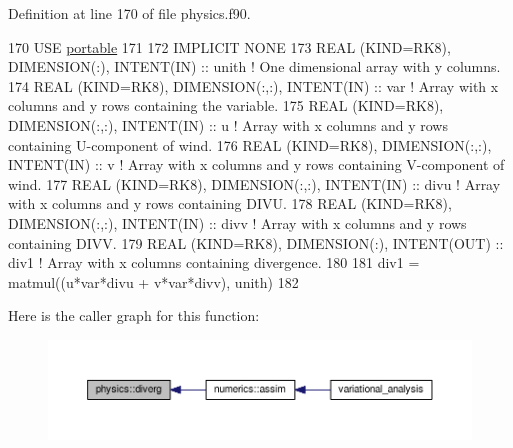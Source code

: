 Definition at line 170 of file physics.\+f90.


\begin{DoxyCode}
170 \textcolor{keywordtype}{USE }\hyperlink{namespaceportable}{portable}
171 
172 \textcolor{keywordtype}{IMPLICIT NONE}
173 \textcolor{keywordtype}{REAL (KIND=RK8)}, \textcolor{keywordtype}{DIMENSION(:)}, \textcolor{keywordtype}{INTENT(IN)}     :: unith      \textcolor{comment}{! One dimensional array with y columns.}
174 \textcolor{keywordtype}{REAL (KIND=RK8)}, \textcolor{keywordtype}{DIMENSION(:,:)}, \textcolor{keywordtype}{INTENT(IN)}   :: var        \textcolor{comment}{! Array with x columns and y rows containing
       the variable.}
175 \textcolor{keywordtype}{REAL (KIND=RK8)}, \textcolor{keywordtype}{DIMENSION(:,:)}, \textcolor{keywordtype}{INTENT(IN)}   :: u          \textcolor{comment}{! Array with x columns and y rows containing
       U-component of wind.}
176 \textcolor{keywordtype}{REAL (KIND=RK8)}, \textcolor{keywordtype}{DIMENSION(:,:)}, \textcolor{keywordtype}{INTENT(IN)}   :: v          \textcolor{comment}{! Array with x columns and y rows containing
       V-component of wind.}
177 \textcolor{keywordtype}{REAL (KIND=RK8)}, \textcolor{keywordtype}{DIMENSION(:,:)}, \textcolor{keywordtype}{INTENT(IN)}   :: divu       \textcolor{comment}{! Array with x columns and y rows containing
       DIVU.}
178 \textcolor{keywordtype}{REAL (KIND=RK8)}, \textcolor{keywordtype}{DIMENSION(:,:)}, \textcolor{keywordtype}{INTENT(IN)}   :: divv       \textcolor{comment}{! Array with x columns and y rows containing
       DIVV.}
179 \textcolor{keywordtype}{REAL (KIND=RK8)}, \textcolor{keywordtype}{DIMENSION(:)}, \textcolor{keywordtype}{INTENT(OUT)}    :: div1       \textcolor{comment}{! Array with x columns containing divergence.}
180 
181 div1    = matmul((u*var*divu + v*var*divv), unith)
182 
\end{DoxyCode}


Here is the caller graph for this function\+:\nopagebreak
\begin{figure}[H]
\begin{center}
\leavevmode
\includegraphics[width=350pt]{namespacephysics_adc35216d512f6586071a79fba286a39c_icgraph}
\end{center}
\end{figure}


